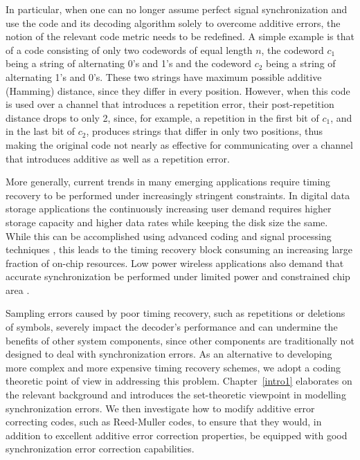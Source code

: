In particular, when one can no longer assume perfect signal
synchronization and use the code and its decoding algorithm solely
to overcome additive errors, the notion of the relevant code metric
needs to be redefined. A simple example is that of a code consisting
of only two codewords of equal length $n$, the codeword $c_1$ being
a string of alternating 0's and 1's and the codeword $c_2$ being a
string of alternating 1's and 0's. These two strings have maximum
possible additive (Hamming) distance, since they differ in every
position. However, when this code is used over a channel that
introduces a repetition error, their post-repetition distance drops
to only 2, since, for example, a repetition in the first bit of
$c_1$, and in the last bit of $c_2$, produces strings that differ in
only two positions, thus making the original code not nearly as
effective for communicating over a channel that introduces additive
as well as a repetition error.


More generally, current trends in many emerging applications require
timing recovery to be performed under increasingly stringent
constraints. In digital data storage applications the continuously
increasing user  demand requires higher storage capacity and higher
data rates while keeping the disk size the same.  While this can be
accomplished using advanced coding and signal processing techniques
\cite{vasic:05}, this leads to the timing recovery block consuming
an increasing large fraction of on-chip resources. Low power
wireless applications also demand that accurate synchronization be
performed under limited power and constrained chip area
\cite{ammer}.

Sampling errors caused by poor timing recovery, such as repetitions
or deletions of symbols, severely impact the decoder's performance
and can undermine the benefits of other system components, since
other components are traditionally not designed to deal with
synchronization errors. As an alternative to developing more complex
and more expensive timing recovery schemes, we adopt a coding
theoretic point of view in addressing this problem.
Chapter~\ref{intro1} elaborates on the relevant background and
introduces the set-theoretic viewpoint in modelling synchronization
errors. We then investigate how to modify additive error correcting
codes, such as Reed-Muller codes, to ensure that they would, in
addition to excellent additive error correction properties, be
equipped with good synchronization error correction capabilities.

